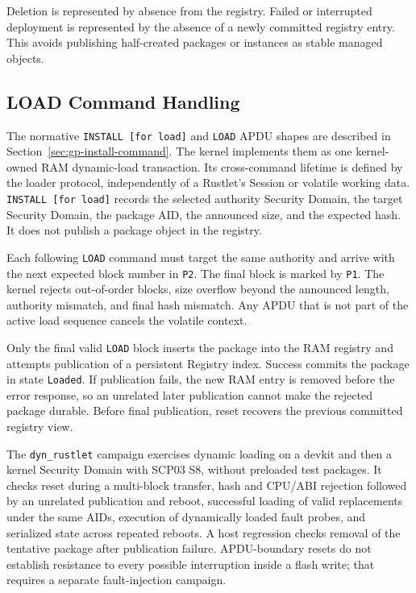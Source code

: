 Deletion is represented by absence from the registry. Failed or interrupted
deployment is represented by the absence of a newly committed registry entry.
This avoids publishing half-created packages or instances as stable managed
objects.

\subsection{LOAD Command Handling}
\label{sec:impl-load}

The normative \texttt{INSTALL [for load]} and \texttt{LOAD} APDU shapes are
described in Section~\ref{sec:gp-install-command}. The kernel implements them
as one kernel-owned RAM dynamic-load transaction. Its cross-command lifetime
is defined by the loader protocol, independently of a Rustlet's Session or
volatile working data. \texttt{INSTALL [for load]} records
the selected authority Security Domain, the target Security Domain, the package
AID, the announced size, and the expected hash. It does not publish a package
object in the registry.

Each following \texttt{LOAD} command must target the same authority and arrive
with the next expected block number in \texttt{P2}. The final block is marked
by \texttt{P1}. The kernel rejects out-of-order blocks, size overflow beyond
the announced length, authority mismatch, and final hash mismatch. Any APDU
that is not part of the active load sequence cancels the volatile context.

Only the final valid \texttt{LOAD} block inserts the package into the RAM
registry and attempts publication of a persistent Registry index. Success
commits the package in state \texttt{Loaded}. If publication fails, the new
RAM entry is removed before the error response, so an unrelated later
publication cannot make the rejected package durable. Before final
publication, reset recovers the previous committed registry view.

The \texttt{dyn\_rustlet} campaign exercises dynamic loading on a devkit and
then a kernel Security Domain with SCP03 S8, without preloaded test packages.
It checks reset during a multi-block transfer, hash and CPU/ABI rejection
followed by an unrelated publication and reboot, successful loading of valid
replacements under the same AIDs, execution of dynamically loaded fault
probes, and serialized state across repeated reboots. A host regression checks
removal of the tentative package after publication failure. APDU-boundary
resets do not establish resistance to every possible interruption inside a
flash write; that requires a separate fault-injection campaign.

